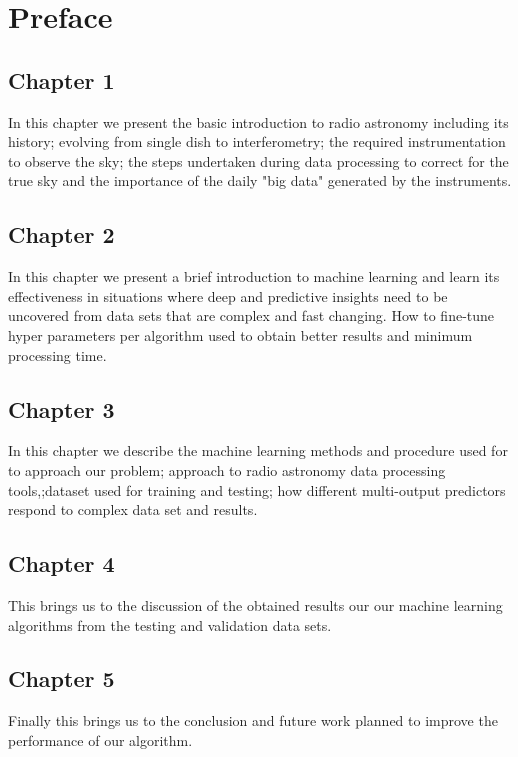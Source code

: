 \chapter*{Preface}

\section*{Chapter 1}
In this chapter we present the basic introduction to radio astronomy including its history; evolving from single dish to interferometry; the required instrumentation to observe the sky; the steps undertaken during data processing to correct for the true sky and the importance of the daily "big data" generated by the instruments.    
\section*{Chapter 2}
In this chapter we present a brief introduction to machine learning and learn its effectiveness in situations where deep and predictive insights need to be uncovered from data sets that are complex and fast changing. How to fine-tune hyper parameters per algorithm used to obtain better results and minimum processing time.  
\section*{Chapter 3}
In this chapter we describe the machine learning methods and procedure used for to approach our problem; approach to radio astronomy data processing tools,;dataset used for training and testing; how different multi-output predictors respond to complex data set and results.
\section*{Chapter 4}
This brings us to the discussion of the obtained results our our machine learning algorithms from the testing and validation data sets. 
\section*{Chapter 5}
Finally this brings us to the conclusion and future work planned to improve the performance of our algorithm.